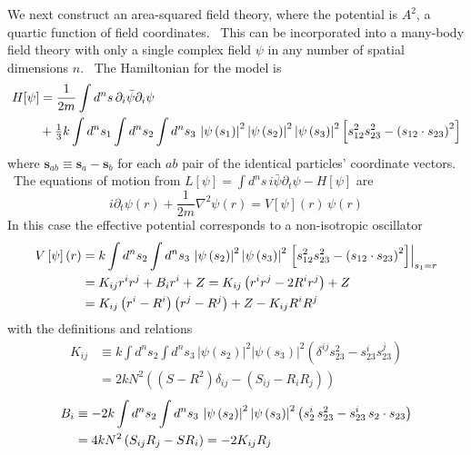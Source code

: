 \documentclass[a4paper,12pt]{article}%
\begin{document}
We next construct an area-squared field theory, where the potential is $A^{2}%
$, a quartic function of field coordinates. \ This can be incorporated into a
many-body field theory with only a single complex field $\psi$ in any number
of spatial dimensions $n$. \ The Hamiltonian for the model is%
\begin{align*}
H[\psi]  &  =\frac{1}{2m}\int d^{n}s\,\partial_{i}\bar{\psi}\partial_{i}\psi\\
&  +\tfrac{1}{3}k\int d^{n}s_{1}\int d^{n}s_{2}\int d^{n}s_{3}\,\left|
\psi\left(  s_{1}\right)  \right|  ^{2}\left|  \psi\left(  s_{2}\right)
\right|  ^{2}\left|  \psi\left(  s_{3}\right)  \right|  ^{2}\left[
s_{{\footnotesize 12}}^{2}s_{{\footnotesize 23}}^{2}-\left(
s_{{\footnotesize 12}}\cdot s_{{\footnotesize 23}}\right)  ^{2}\right]
\end{align*}
where $\mathbf{s}_{ab}\equiv\mathbf{s}_{a}-\mathbf{s}_{b}$ for each $ab$ pair
of the identical particles' coordinate vectors. \ The equations of motion from
$L\left[  \psi\right]  =\int d^{n}s\,i\bar{\psi}\partial_{t}\psi-H[\psi]$ are%
\[
i\partial_{t}\psi\left(  r\right)  +\frac{1}{2m}\nabla^{2}\psi\left(
r\right)  =V\left[  \psi\right]  \left(  r\right)  \,\psi\left(  r\right)
\]
In this case the effective potential corresponds to a non-isotropic
oscillator
\begin{align*}
V\left[  \psi\right]  \left(  r\right)   &  =k\int d^{n}s_{2}\int d^{n}%
s_{3}\,\left|  \psi\left(  s_{2}\right)  \right|  ^{2}\left|  \psi\left(
s_{3}\right)  \right|  ^{2}\left.  \left[  s_{{\footnotesize 12}}%
^{2}s_{{\footnotesize 23}}^{2}-\left(  s_{{\footnotesize 12}}\cdot
s_{{\footnotesize 23}}\right)  ^{2}\right]  \right|  _{s_{1}=r}\\
&  =K_{ij}r^{i}r^{j}+B_{i}r^{i}+Z=K_{ij}\left(  r^{i}r^{j}-2R^{i}r^{j}\right)
+Z\\
&  =K_{ij}\left(  r^{i}-R^{i}\right)  \left(  r^{j}-R^{j}\right)
+Z-K_{ij}R^{i}R^{j}%
\end{align*}
with the definitions and relations
\begin{align*}
K_{ij}  &  \equiv k\int d^{n}s_{2}\int d^{n}s_{3}\,\left|  \psi\left(
s_{2}\right)  \right|  ^{2}\left|  \psi\left(  s_{3}\right)  \right|
^{2}\left(  \delta^{ij}s_{23}^{2}-s_{23}^{i}s_{23}^{j}\right) \\
&  =2kN^{2}\left(  \left(  S-R^{2}\right)  \delta_{ij}-\left(  S_{ij}%
-R_{i}R_{j}\right)  \right)
\end{align*}%
\begin{align*}
B_{i}  &  \equiv-2k\int d^{n}s_{2}\int d^{n}s_{3}\,\left|  \psi\left(
s_{2}\right)  \right|  ^{2}\left|  \psi\left(  s_{3}\right)  \right|
^{2}\left(  s_{{\footnotesize 2}}^{i}\,s_{{\footnotesize 23}}^{2}%
-s_{{\footnotesize 23}}^{i}\,s_{{\footnotesize 2}}\cdot s_{{\footnotesize 23}%
}\right) \\
&  =4kN^{2}\left(  S_{ij}R_{j}-SR_{i}\right)  =-2K_{ij}R_{j}%
\end{align*}%
\end{document}
